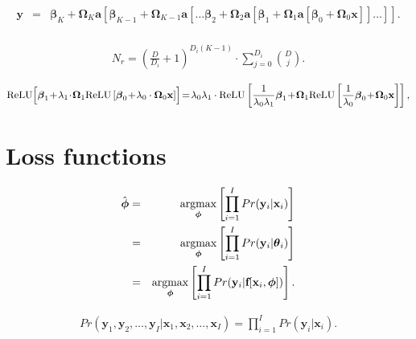 \documentclass[letterpaper,twoside,openany, titlepage,oldfontcommands,titles,dvipsnames]{memoir}
\begin{document}
\begin{eqnarray}\label{eq:dnn_la2}
  \mathbf{y}\!\! &\!\!=\!\!& \!\!\boldsymbol\beta_{K} +\boldsymbol\Omega_{K}\mathbf{a}\left[\boldsymbol\beta_{K-1} +\boldsymbol\Omega_{K-1}\mathbf{a}\left[\ldots
  \boldsymbol\beta_{2} +\boldsymbol\Omega_{2}\mathbf{a}\left[\boldsymbol\beta_{1} +\boldsymbol\Omega_{1}\mathbf{a}\left[\boldsymbol\beta_{0} +\boldsymbol\Omega_{0}\mathbf{x}\right]\right]\ldots\right]\right].\nonumber \\
 \end{eqnarray}

\begin{eqnarray}\label{eq:dnn_deep_param_calc}
  N_{r} = \left(\frac{D}{D_{i}}+1\right)^{D_{i}(K-1)}\cdot\sum_{j=0}^{D_{i}}\binom{D}{j}.
 \end{eqnarray}


\begin{eqnarray}
 \mbox{ReLU}\Bigl[\boldsymbol\beta_{1}\!+\!\lambda_1\!\cdot\!\boldsymbol\Omega_{1}\mbox{ReLU}\left[\boldsymbol\beta_{0}\!+\!\lambda_{0}\cdot\boldsymbol\Omega_{0}\mathbf{x}\right] \Bigr]\!=\! \lambda_0\lambda_{1}\cdot \mbox{ReLU}\left[\frac{1}{\lambda_0\lambda_1}\boldsymbol\beta_{1}\!+\!\boldsymbol\Omega_{1}\mbox{ReLU}\left[\frac{1}{\lambda_0}\boldsymbol\beta_{0}\!+\!\boldsymbol\Omega_{0}\mathbf{x}\right]\right],
 \end{eqnarray}

\chapter{Loss functions}


\begin{eqnarray}\label{eq:loss_max_like1}
  \hat{\boldsymbol\phi} &=& \mathop{\rm argmax}_{\boldsymbol\phi}\left[\prod_{i=1}^{I} Pr(\mathbf{y}_{i}|\mathbf{x}_{i})\right]\nonumber\\
  &=& \mathop{\rm argmax}_{\boldsymbol\phi}\left[\prod_{i=1}^{I} Pr(\mathbf{y}_{i}|\boldsymbol\theta_{i})\right] \nonumber \\ &=& \mathop{\rm argmax}_{\boldsymbol\phi}\left[\prod_{i=1}^{I} Pr(\mathbf{y}_{i}|\mbox{\bf f}[\mathbf{x}_{i},\boldsymbol\phi])\right].
 \end{eqnarray}

\begin{eqnarray}
  Pr(\mathbf{y}_{1},\mathbf{y}_{2},\ldots, \mathbf{y}_{I}|\mathbf{x}_{1},\mathbf{x}_{2},\ldots,\mathbf{x}_{I}) = \prod_{i=1}^{I} Pr(\mathbf{y}_{i}|\mathbf{x}_{i}).
 \end{eqnarray}
\end{document}
